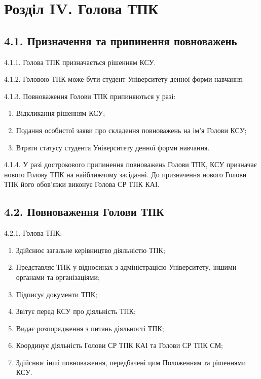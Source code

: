 \section*{Розділ IV. Голова ТПК}

\subsection*{4.1. Призначення та припинення повноважень}
    4.1.1. Голова ТПК призначається рішенням КСУ.

    4.1.2. Головою ТПК може бути студент Університету денної форми навчання.

    4.1.3. Повноваження Голови ТПК припиняються у разі:

        \begin{enumerate}[label=\alph*)]
            \item Відкликання рішенням КСУ;
            \item Подання особистої заяви про складення повноважень на ім'я Голови КСУ;
            \item Втрати статусу студента Університету денної форми навчання.
        \end{enumerate}

    4.1.4. У разі дострокового припинення повноважень Голови ТПК, КСУ призначає нового Голову ТПК на найближчому засіданні. До призначення нового Голови ТПК його обов'язки виконує Голова СР ТПК КАІ.

\subsection*{4.2. Повноваження Голови ТПК}
    4.2.1. Голова ТПК:

        \begin{enumerate}[label=\alph*)]
            \item Здійснює загальне керівництво діяльністю ТПК;
            \item Представляє ТПК у відносинах з адміністрацією Університету, іншими органами та організаціями;
            \item Підписує документи ТПК;
            \item Звітує перед КСУ про діяльність ТПК;
            \item Видає розпорядження з питань діяльності ТПК;
            \item Координує діяльність Голови СР ТПК КАІ та Голови СР ТПК СМ;
            \item Здійснює інші повноваження, передбачені цим Положенням та рішеннями КСУ.
        \end{enumerate}

